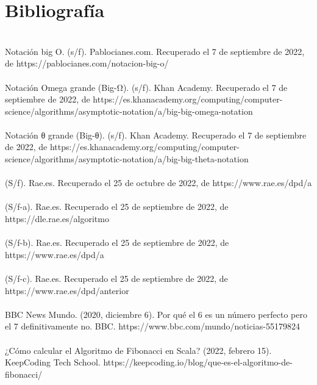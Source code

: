 \documentclass[12pt,twoside]{article}
\begin{document}
\section{Bibliograf\'ia}
\\
Notación big O. (s/f). Pablocianes.com. Recuperado el 7 de septiembre de 2022, de https://pablocianes.com/notacion-big-o/
\\
\\
Notación Omega grande (Big-Ω). (s/f). Khan Academy. Recuperado el 7 de septiembre de 2022, de https://es.khanacademy.org/computing/computer-science/algorithms/asymptotic-notation/a/big-big-omega-notation
\\
\\
Notación θ grande (Big-θ). (s/f). Khan Academy. Recuperado el 7 de septiembre de 2022, de https://es.khanacademy.org/computing/computer-science/algorithms/asymptotic-notation/a/big-big-theta-notation
\\
\\
(S/f). Rae.es. Recuperado el 25 de octubre de 2022, de https://www.rae.es/dpd/a%
\\
\\
(S/f-a). Rae.es. Recuperado el 25 de septiembre de 2022, de https://dle.rae.es/algoritmo
\\
\\
(S/f-b). Rae.es. Recuperado el 25 de septiembre de 2022, de https://www.rae.es/dpd/a%
\\
\\
(S/f-c). Rae.es. Recuperado el 25 de septiembre de 2022, de https://www.rae.es/dpd/anterior
\\
\\
BBC News Mundo. (2020, diciembre 6). Por qué el 6 es un número perfecto pero el 7 definitivamente no. BBC. https://www.bbc.com/mundo/noticias-55179824
\\
\\
¿Cómo calcular el Algoritmo de Fibonacci en Scala? (2022, febrero 15). KeepCoding Tech School. https://keepcoding.io/blog/que-es-el-algoritmo-de-fibonacci/

\medskip
\end{document}
